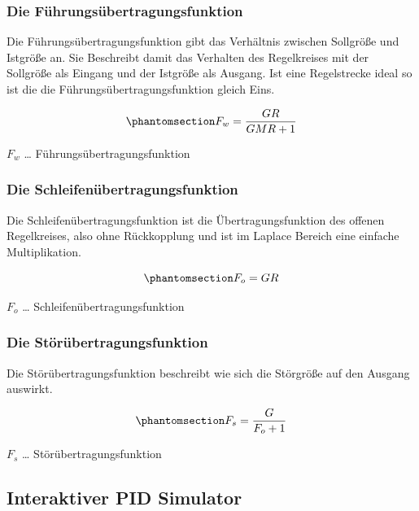 \documentclass[
  letterpaper,
  DIV=11]{scrreprt}
\begin{document}
\subsubsection{Die
Führungsübertragungsfunktion}\label{die-fuxfchrungsuxfcbertragungsfunktion}

Die Führungsübertragungsfunktion gibt das Verhältnis zwischen Sollgröße
und Istgröße an. Sie Beschreibt damit das Verhalten des Regelkreises mit
der Sollgröße als Eingang und der Istgröße als Ausgang. Ist eine
Regelstrecke ideal so ist die die Führungsübertragungsfunktion gleich
Eins.

\begin{equation}\phantomsection\label{eq-Fw_eq}{
F_{w} = \frac{G R}{G M R + 1}
}\end{equation}

\(F_{w}\) \ldots{} Führungsübertragungsfunktion

\subsubsection{Die
Schleifenübertragungsfunktion}\label{die-schleifenuxfcbertragungsfunktion}

Die Schleifenübertragungsfunktion ist die Übertragungsfunktion des
offenen Regelkreises, also ohne Rückkopplung und ist im Laplace Bereich
eine einfache Multiplikation.

\begin{equation}\phantomsection\label{eq-Dummy}{
F_{o} = G R
}\end{equation}

\(F_{o}\) \ldots{} Schleifenübertragungsfunktion

\subsubsection{Die
Störübertragungsfunktion}\label{die-stuxf6ruxfcbertragungsfunktion}

Die Störübertragungsfunktion beschreibt wie sich die Störgröße auf den
Ausgang auswirkt.

\begin{equation}\phantomsection\label{eq-Dummy}{
F_{s} = \frac{G}{F_{o} + 1}
}\end{equation}

\(F_{s}\) \ldots{} Störübertragungsfunktion

\subsection{Interaktiver PID
Simulator}\label{interaktiver-pid-simulator}
\end{document}
